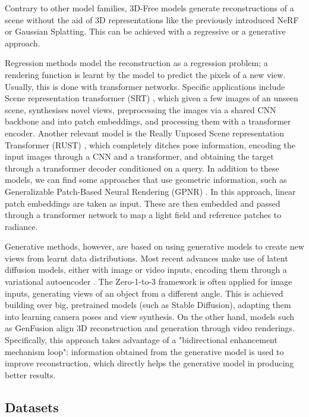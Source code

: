 \documentclass[
	a4paper, %
	10pt, %
	unnumberedsections, %
	twoside, %
]{LTJournalArticle}
\begin{document}
Contrary to other model families, 3D-Free models generate reconstructions of a scene without the aid of 3D representations like the previously introduced NeRF or Gaussian Splatting. This can be achieved with a regressive or a generative approach.

Regression methods model the reconstruction as a regression problem; a rendering function is learnt by the model to predict the pixels of a new view. Usually, this is done with transformer networks. Specific applications include Scene representation transformer (SRT) \cite{sajjadi2022scene}, which given a few images of an unseen scene, synthesises novel views, preprocessing the images via a shared CNN backbone and into patch embeddings, and processing them with a transformer encoder. Another relevant model is the Really Unposed Scene representation Transformer (RUST) \cite{sajjadi2023rustlatentneuralscene}, which completely ditches pose information, encoding the input images through a CNN and a transformer, and obtaining the target through a transformer decoder conditioned on a query. In addition to these models, we can find some approaches that use geometric information, such as Generalizable Patch-Based Neural Rendering (GPNR) \cite{suhail2022generalizablepatchbasedneuralrendering}. In this approach, linear patch embeddings are taken as input. These are then embedded and passed through a transformer network to map a light field and reference patches to radiance.

Generative methods, however, are based on using generative models to create new views from learnt data distributions. Most recent advances make use of latent diffusion models, either with image or video inputs, encoding them through a variational autoencoder \cite{feedforward_nerf_survey}. The Zero-1-to-3 framework \cite{liu2023zero1to3zeroshotimage3d} is often applied for image inputs, generating views of an object from a different angle. This is achieved building over big, pretrained models (such as Stable Diffusion), adapting them into learning camera poses and view synthesis. On the other hand, models such as GenFusion \cite{wu2025genfusionclosingloopreconstruction} align 3D reconstruction and generation through video renderings. Specifically, this approach takes advantage of a "bidirectional enhancement mechanism loop": information obtained from the generative model is used to improve reconstruction, which directly helps the generative model in producing better results.

\subsection{Datasets}
\end{document}
